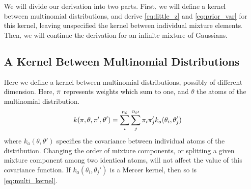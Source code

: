 We will divide our derivation into two parts.  First, we will define a kernel between multinomial distributions, and derive \eqref{eq:little_z} and \eqref{eq:prior_var} for this kernel, leaving unspecified the kernel between individual mixture elements.  Then, we will continue the derivation for an infinite mixture of Gaussians.

\subsection{A Kernel Between Multinomial Distributions} 

Here we define a kernel between multinomial distributions, possibly of different dimension.  Here, ${\bf{\pi}}$ represents weights which sum to one, and $\theta$ the atoms of the multinomial distribution.
%
\begin{align}
k({\bf{\pi}}, {\bf{\theta}}, {\bf{\pi}}', {\bf{\theta}}') = \sum_i^{n_\theta} \sum_j^{n_{\theta'}} \pi_i \pi_j' k_a( \theta_i, \theta_j')
\label{eq:multi_kernel}
\end{align}
%
where $k_a( \theta, \theta')$ specifies the covariance between individual atoms of the distribution.  Changing the order of mixture components, or splitting a given mixture component among two identical atoms, will not affect the value of this covariance function.  If $k_a( \theta_i, \theta_j')$ is a Mercer kernel, then so is \eqref{eq:multi_kernel}.


